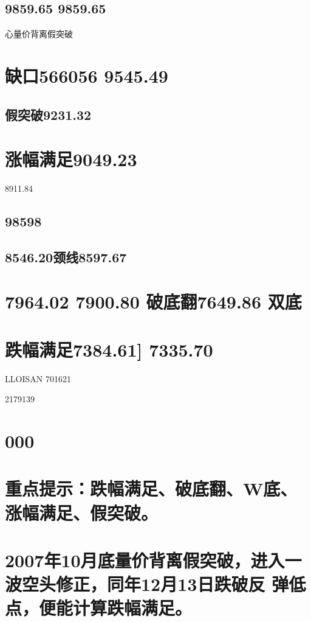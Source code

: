 \documentclass{article}
\begin{document}
\subsection{9859.65 9859.65}

心量价背离假突破

\section{缺口566056 9545.49}

\subsection{假突破9231.32}

\section{涨幅满足9049.23}

8911.84

\subsection{98598}

\subsection{8546.20颈线8597.67}

\section{7964.02 7900.80 破底翻7649.86 双底}

\section{跌幅满足7384.61] 7335.70}

LLOISAN 701621

2179139

\section{000}

\section{重点提示：跌幅满足、破底翻、W底、涨幅满足、假突破。}

\section{2007年10月底量价背离假突破，进入一波空头修正，同年12月13日跌破反 弹低点，便能计算跌幅满足。}
\end{document}
